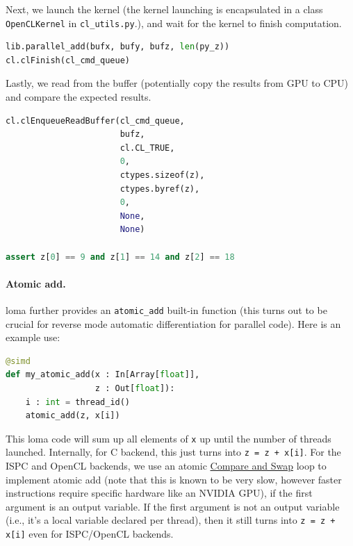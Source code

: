 Next, we launch the kernel (the kernel launching is encapsulated in a class \lstinline{OpenCLKernel} in \lstinline{cl_utils.py}.), and wait for the kernel to finish computation.
\begin{lstlisting}[language=python]
lib.parallel_add(bufx, bufy, bufz, len(py_z))
cl.clFinish(cl_cmd_queue)
\end{lstlisting}

Lastly, we read from the buffer (potentially copy the results from GPU to CPU) and compare the expected results.
\begin{lstlisting}[language=python]
cl.clEnqueueReadBuffer(cl_cmd_queue,
                       bufz,
                       cl.CL_TRUE,
                       0,
                       ctypes.sizeof(z),
                       ctypes.byref(z),
                       0,
                       None,
                       None)

assert z[0] == 9 and z[1] == 14 and z[2] == 18
\end{lstlisting}

\paragraph{Atomic add.} loma further provides an \lstinline{atomic_add} built-in function (this turns out to be crucial for reverse mode automatic differentiation for parallel code). Here is an example use:
\begin{lstlisting}[language=python]
@simd
def my_atomic_add(x : In[Array[float]],
                  z : Out[float]):
    i : int = thread_id()
    atomic_add(z, x[i])
\end{lstlisting}
This loma code will sum up all elements of \lstinline{x} up until the number of threads launched. Internally, for C backend, this just turns into \lstinline{z = z + x[i]}. For the ISPC and OpenCL backends, we use an atomic \href{https://en.wikipedia.org/wiki/Compare-and-swap}{Compare and Swap} loop to implement atomic add (note that this is known to be very slow, however faster instructions require specific hardware like an NVIDIA GPU), if the first argument is an output variable. If the first argument is not an output variable (i.e., it's a local variable declared per thread), then it still turns into \lstinline{z = z + x[i]} even for ISPC/OpenCL backends.

